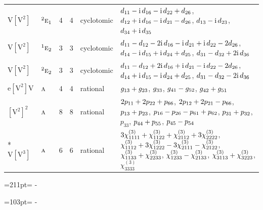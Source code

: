 \documentclass[10pt,a4paper]{article}
\newcommand{\needspace}[1]{\par\penalty-100\begingroup\dimen0=#1\relax\dimen2=\pagegoal
  \advance\dimen2-\pagetotal\ifdim\dimen0>\dimen2\relax\ifdim\dimen2>0pt\vfil\break\fi\fi
  \endgroup}
\numberwithin{equation}{section}
\newcommand{\irr}[1]{\text{\normalfont\scshape #1}}
\newcommand{\conjpair}[1]{{}^{#1}}
\newcommand{\iunit}{\mathrm{i}}
\newcommand{\jahn}[1]{\mathrm{#1}}
\newlength{\fillwidth}\newlength{\cellwidth}\newlength{\colwidth}
\newcommand{\signbreak}{\penalty100\relax}
\begin{document}
{\begin{longtable}{@{}llrrl>{\RaggedRight\arraybackslash}p{\fillwidth}@{}}
$\jahn{V[V^{2}]}$ & $\conjpair{2}\irr{e}_{1}$ & 4 & 4 & cyclotomic & $d_{11} -\signbreak \iunit{}\,d_{16} -\signbreak \iunit{}\,d_{22} +\signbreak d_{26}$, $d_{12} +\signbreak \iunit{}\,d_{16} -\signbreak \iunit{}\,d_{21} -\signbreak d_{26}$, $d_{13} -\signbreak \iunit{}\,d_{23}$, $d_{34} +\signbreak \iunit{}\,d_{35}$\\
$\jahn{V[V^{2}]}$ & $\conjpair{1}\irr{e}_{2}$ & 3 & 3 & cyclotomic & $d_{11} -\signbreak d_{12} -\signbreak 2\iunit{}\,d_{16} -\signbreak \iunit{}\,d_{21} +\signbreak \iunit{}\,d_{22} -\signbreak 2d_{26}$, $d_{14} -\signbreak \iunit{}\,d_{15} +\signbreak \iunit{}\,d_{24} +\signbreak d_{25}$, $d_{31} -\signbreak d_{32} +\signbreak 2\iunit{}\,d_{36}$\\
$\jahn{V[V^{2}]}$ & $\conjpair{2}\irr{e}_{2}$ & 3 & 3 & cyclotomic & $d_{11} -\signbreak d_{12} +\signbreak 2\iunit{}\,d_{16} +\signbreak \iunit{}\,d_{21} -\signbreak \iunit{}\,d_{22} -\signbreak 2d_{26}$, $d_{14} +\signbreak \iunit{}\,d_{15} -\signbreak \iunit{}\,d_{24} +\signbreak d_{25}$, $d_{31} -\signbreak d_{32} -\signbreak 2\iunit{}\,d_{36}$\\
$\jahn{e[V^{2}]V}$ & $\irr{a}$ & 4 & 4 & rational & $\mathnormal{g}_{13} +\signbreak \mathnormal{g}_{23}$, $\mathnormal{g}_{33}$, $\mathnormal{g}_{41} -\signbreak \mathnormal{g}_{52}$, $\mathnormal{g}_{42} +\signbreak \mathnormal{g}_{51}$\\
$\jahn{[V^{2}]^{2}}$ & $\irr{a}$ & 8 & 8 & rational & $2p_{11} +\signbreak 2p_{22} +\signbreak p_{66}$, $2p_{12} +\signbreak 2p_{21} -\signbreak p_{66}$, $p_{13} +\signbreak p_{23}$, $p_{16} -\signbreak p_{26} -\signbreak p_{61} +\signbreak p_{62}$, $p_{31} +\signbreak p_{32}$, $p_{33}$, $p_{44} +\signbreak p_{55}$, $p_{45} -\signbreak p_{54}$\\*
$\jahn{V[V^{3}]}$ & $\irr{a}$ & 6 & 6 & rational & $3\chi^{(3)}_{1111} +\signbreak \chi^{(3)}_{1122} +\signbreak \chi^{(3)}_{2112} +\signbreak 3\chi^{(3)}_{2222}$, $\chi^{(3)}_{1112} +\signbreak 3\chi^{(3)}_{1222} -\signbreak 3\chi^{(3)}_{2111} -\signbreak \chi^{(3)}_{2122}$, $\chi^{(3)}_{1133} +\signbreak \chi^{(3)}_{2233}$, $\chi^{(3)}_{1233} -\signbreak \chi^{(3)}_{2133}$, $\chi^{(3)}_{3113} +\signbreak \chi^{(3)}_{3223}$, $\chi^{(3)}_{3333}$\\
\bottomrule\end{longtable}}
\needspace{211pt}
\needspace{103pt}
\end{document}

